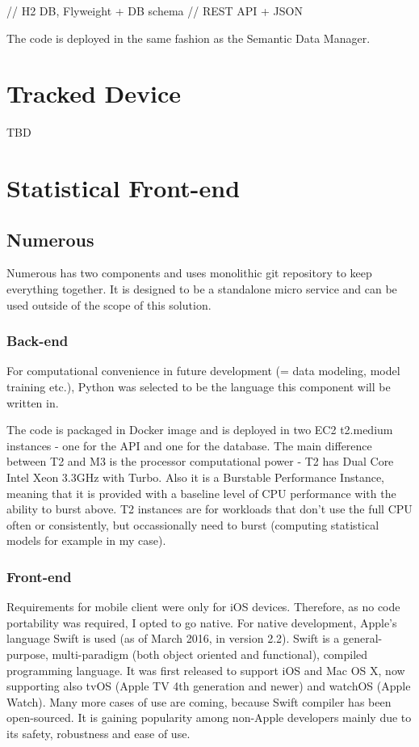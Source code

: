 // H2 DB, Flyweight + DB schema
// REST API + JSON

The code is deployed in the same fashion as the Semantic Data Manager.

\section{Tracked Device}
TBD

\section{Statistical Front-end}

\subsection{Numerous}
Numerous has two components and uses monolithic git repository to keep everything together. It is designed to be a standalone micro service and can be used outside of the scope of this solution.

\subsubsection{Back-end}
For computational convenience in future development (= data modeling, model training etc.), Python was selected to be the language this component will be written in.

The code is packaged in Docker image and is deployed in two EC2 t2.medium instances - one for the API and one for the database. The main difference between T2 and M3 is the processor computational power - T2 has Dual Core Intel Xeon 3.3GHz with Turbo. Also it is a Burstable Performance Instance, meaning that it is provided with a baseline level of CPU performance with the ability to burst above. T2 instances are for workloads that don't use the full CPU often or consistently, but occassionally need to burst (computing statistical models for example in my case).

\subsubsection{Front-end}
Requirements for mobile client were only for iOS devices. Therefore, as no code portability was required, I opted to go native. For native development, Apple's language Swift is used (as of March 2016, in version 2.2). Swift is a general-purpose, multi-paradigm (both object oriented and functional), compiled programming language. It was first released to support iOS and Mac OS X, now supporting also tvOS (Apple TV 4th generation and newer) and watchOS (Apple Watch). Many more cases of use are coming, because Swift compiler has been open-sourced. It is gaining popularity among non-Apple developers mainly due to its safety, robustness and ease of use.

